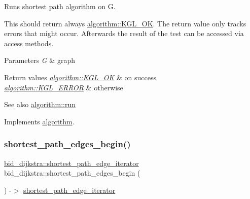 Runs shortest path algorithm on {\ttfamily G}. 

This should return always \mbox{\hyperlink{classalgorithm_af1a0078e153aa99c24f9bdf0d97f6710aae4c1cd7fe8d8cf4b143241a6e7c31cf}{algorithm\+::\+K\+G\+L\+\_\+\+OK}}. The return value only tracks errors that might occur. Afterwards the result of the test can be accessed via access methods.


\begin{DoxyParams}{Parameters}
{\em G} & graph\\
\hline
\end{DoxyParams}

\begin{DoxyRetVals}{Return values}
{\em \mbox{\hyperlink{classalgorithm_af1a0078e153aa99c24f9bdf0d97f6710aae4c1cd7fe8d8cf4b143241a6e7c31cf}{algorithm\+::\+K\+G\+L\+\_\+\+OK}}} & on success \\
\hline
{\em \mbox{\hyperlink{classalgorithm_af1a0078e153aa99c24f9bdf0d97f6710ae67bf27b2ef31f73e545a7f9f4a69556}{algorithm\+::\+K\+G\+L\+\_\+\+E\+R\+R\+OR}}} & otherwise\\
\hline
\end{DoxyRetVals}
\begin{DoxySeeAlso}{See also}
\mbox{\hyperlink{classalgorithm_a482eb28cacba018b5a86d3a819a50a2f}{algorithm\+::run}} 
\end{DoxySeeAlso}


Implements \mbox{\hyperlink{classalgorithm_a482eb28cacba018b5a86d3a819a50a2f}{algorithm}}.

\mbox{\label{classbid__dijkstra_a526e88fb20c84fda11d5d4205e6da578}} 
\subsubsection{\texorpdfstring{shortest\+\_\+path\+\_\+edges\+\_\+begin()}{shortest\_path\_edges\_begin()}}
{\footnotesize\ttfamily \mbox{\hyperlink{classbid__dijkstra_a703d0faf9568bc25a9305faa61412fe1}{bid\+\_\+dijkstra\+::shortest\+\_\+path\+\_\+edge\+\_\+iterator}} bid\+\_\+dijkstra\+::shortest\+\_\+path\+\_\+edges\+\_\+begin (\begin{DoxyParamCaption}{ }\end{DoxyParamCaption}) -\/$>$ \mbox{\hyperlink{classbid__dijkstra_a703d0faf9568bc25a9305faa61412fe1}{shortest\+\_\+path\+\_\+edge\+\_\+iterator}}}



